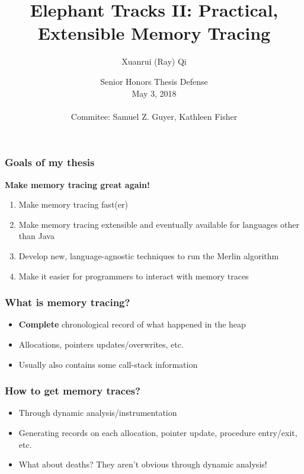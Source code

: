 \documentclass[11pt]{beamer}
\author{Xuanrui (Ray) Qi}
\title{Elephant Tracks II: Practical, Extensible Memory Tracing}
\institute{Department of Computer Science,\\Tufts University}
\date{Senior Honors Thesis Defense\\May 3, 2018\\~\\
  \small
  Commitee: Samuel Z. Guyer, Kathleen Fisher}
\begin{document}
\begin{frame}
\titlepage
\end{frame}


\begin{frame}
  \frametitle{Goals of my thesis}
  \textbf{Make memory tracing great again!}
  \begin{enumerate}
  \item Make memory tracing fast(er)
  \item Make memory tracing extensible and eventually available for
    languages other than Java
  \item Develop new, language-agnostic techniques to run the Merlin algorithm
  \item Make it easier for programmers to interact with memory traces
  \end{enumerate}
\end{frame}

\begin{frame}
  \frametitle{What is memory tracing?}
  \begin{itemize}
  \item \textbf{Complete} chronological record of what happened in the heap
  \item Allocations, pointers updates/overwrites, etc.
  \item Usually also contains some call-stack information
  \end{itemize}
\end{frame}

\begin{frame}
  \frametitle{How to get memory traces?}
  \begin{itemize}
  \item Through dynamic analysis/instrumentation
    \pause
  \item Generating records on each allocation, pointer update, procedure entry/exit, etc.
    \pause
  \item What about deaths? They aren't obvious through dynamic analysis!
  \end{itemize}
\end{frame}
\end{document}
